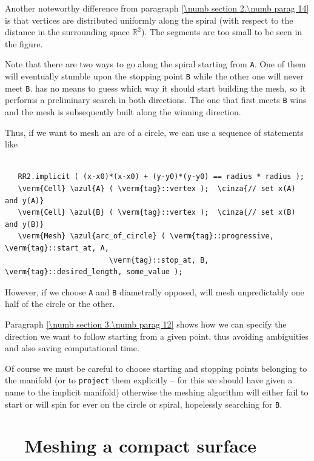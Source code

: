 Another noteworthy difference from paragraph \ref{\numb section 2.\numb parag 14} is that
vertices are distributed uniformly along the spiral (with respect to the distance
in the surrounding space $ \mathbb{R}^2 $).
The segments are too small to be seen in the figure.

Note that there are two ways to go along the spiral starting from {\small\tt A}.
One of them will eventually stumble upon the stopping point {\small\tt B} while
the other one will never meet {\small\tt B}.
{\ManiFEM} has no means to guess which way it should start building the mesh,
so it performs a preliminary search in both directions.
The one that first meets {\small\tt B} wins and the mesh is subsequently built along
the winning direction.

Thus, if we want to mesh an arc of a circle, we can use a sequence of statements like

\begin{Verbatim}[commandchars=\\\{\},formatcom=\small\tt,
   baselinestretch=0.94,framesep=2mm                      ]

   RR2.implicit ( (x-x0)*(x-x0) + (y-y0)*(y-y0) == radius * radius );
   \verm{Cell} \azul{A} ( \verm{tag}::vertex );  \cinza{// set x(A) and y(A)}
   \verm{Cell} \azul{B} ( \verm{tag}::vertex );  \cinza{// set x(B) and y(B)}
   \verm{Mesh} \azul{arc_of_circle} ( \verm{tag}::progressive, \verm{tag}::start_at, A,
                        \verm{tag}::stop_at, B, \verm{tag}::desired_length, some_value );
\end{Verbatim}

However, if we choose {\small\tt A} and {\small\tt B} diametrally opposed, {\maniFEM} will
mesh unpredictably one half of the circle or the other.

Paragraph \ref{\numb section 3.\numb parag 12} shows how we can specify the direction we
want to follow starting from a given point, thus avoiding ambiguities and also saving
computational time.

Of course we must be careful to choose starting and stopping points belonging to the manifold
(or to {\small\tt project} them explicitly -- for this we should have given a name to the
implicit manifold) otherwise the meshing algorithm will either fail to start or will spin
for ever on the circle or spiral, hopelessly searching for {\small\tt B}.


\section{~~Meshing a compact surface}\label{\numb section 3.\numb parag 6}

